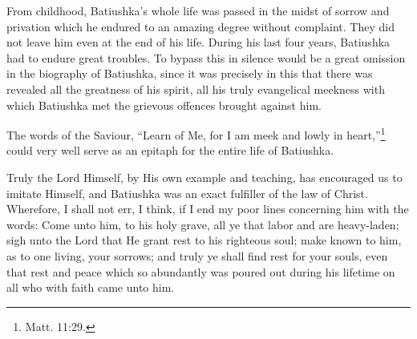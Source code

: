 From childhood, Batiushka's whole life was passed in the midst of sorrow and privation which he endured to an amazing degree without complaint. They did not leave him even at the end of his life. During his last four years, Batiushka had to endure great troubles. To bypass this in silence would be a great omission in the biography of Batiushka, since it was precisely in this that there was revealed all the greatness of his spirit, all his truly evangelical meekness with which Batiushka met the grievous offences brought against him.

The words of the Saviour, ``Learn of Me, for I am meek and lowly in heart,''\footnote{Matt. 11:29.} could very well serve as an epitaph for the entire life of Batiushka.

Truly the Lord Himself, by His own example and teaching, has encouraged us to imitate Himself, and Batiushka was an exact fulfiller of the law of Christ. Wherefore, I shall not err, I think, if I end my poor lines concerning him with the words: Come unto him, to his holy grave, all ye that labor and are heavy-laden; sigh unto the Lord that He grant rest to his righteous soul; make known to him, as to one living, your sorrows; and truly ye shall find rest for your souls, even that rest and peace which so abundantly was poured out during his lifetime on all who with faith came unto him.
